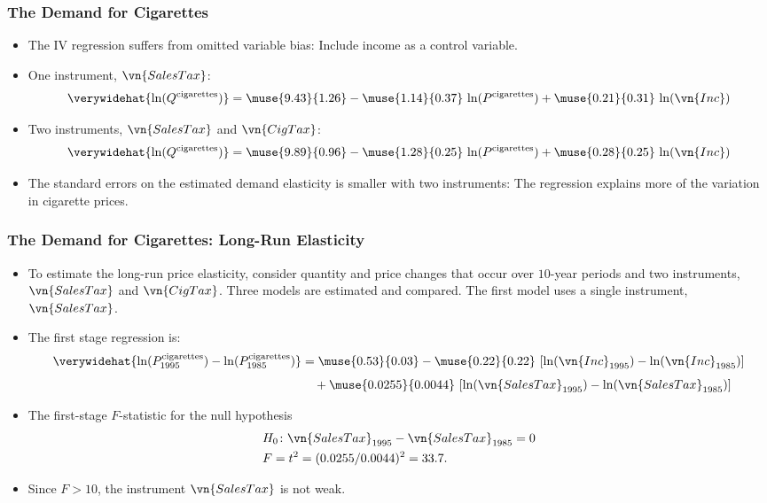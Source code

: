 

\begin{frame}
\frametitle{The Demand for Cigarettes}
\begin{itemize}
\item The IV regression suffers from omitted variable bias: Include income as a control variable.
\item One instrument, $\vn{SalesTax}$:
\begin{align*}
\verywidehat{\ln(Q^{\text{cigarettes}})} 
  = \muse{9.43}{1.26} 
   -\muse{1.14}{0.37}\,\ln(P^{\text{cigarettes}})
   +\muse{0.21}{0.31}\,\ln(\vn{Inc})
\end{align*}
\item Two instruments, $\vn{SalesTax}$ and $\vn{CigTax}$:
\begin{align*}
\verywidehat{\ln(Q^{\text{cigarettes}})} 
  = \muse{9.89}{0.96} 
   -\muse{1.28}{0.25}\,\ln(P^{\text{cigarettes}})
   +\muse{0.28}{0.25}\,\ln(\vn{Inc})
\end{align*}
\item The standard errors on the estimated demand elasticity is smaller with two instruments:
\newlinequad
The regression explains more of the variation in cigarette prices.
\end{itemize}
\end{frame}


\begin{frame}
\frametitle{The Demand for Cigarettes: Long-Run Elasticity}
\begin{itemize}
\item To estimate the long-run price elasticity, consider quantity and price changes that occur over $10$-year periods and two instruments, $\vn{SalesTax}$ and $\vn{CigTax}$. Three models are estimated and compared. The first model uses a single instrument, $\vn{SalesTax}$. 
\item The first stage regression is:
\begin{align*}
\verywidehat{\ln(P^{\text{cigarettes}}_{1995})-\ln(P^{\text{cigarettes}}_{1985})} 
  & = \muse{0.53}{0.03} 
   -\muse{0.22}{0.22}\,\left[\ln(\vn{Inc}_{1995})-\ln(\vn{Inc}_{1985})\right]\\[1ex]
  & \quad +\muse{0.0255}{0.0044}\,\left[\ln(\vn{SalesTax}_{1995})-\ln(\vn{SalesTax}_{1985})\right]
\end{align*}
\item The first-stage $F$-statistic for the null hypothesis
\begin{align*}
& H_{0}\colon \vn{SalesTax}_{1995} - \vn{SalesTax}_{1985} = 0 \\
& F = t^{2} = (0.0255/0.0044)^2 = 33.7.
\end{align*}
\item Since $F>10$, the instrument $\vn{SalesTax}$ is not weak.
\end{itemize}
\end{frame}


